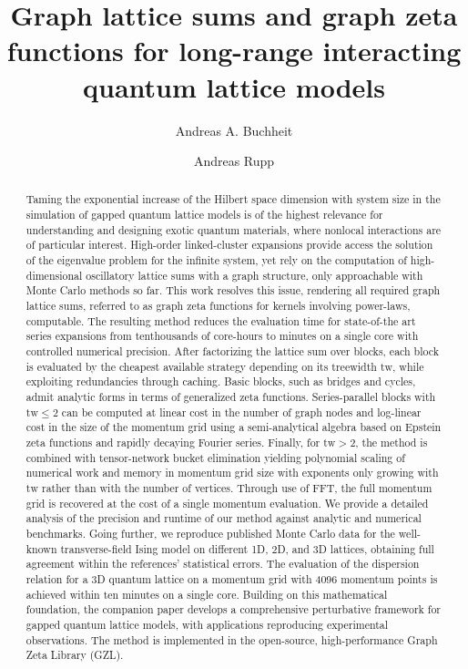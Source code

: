 \documentclass[]{amsart}
\numberwithin{mythm}{section}
\begin{document}
\title[Graph lattice sums]{Graph lattice sums and graph zeta functions for long-range interacting quantum lattice models}

\author{Andreas A. Buchheit}
\address{Saarland University, Department of Mathematics, 66123 Saarbrücken, Germany \\ 
ETH Zürich, Department of Mathematics, 8092 Zürich, Switzerland}

\author{Andreas Rupp}
\address{Saarland University, Department of Mathematics, 66123 Saarbrücken, Germany}



\begin{abstract}

Taming the exponential increase of the Hilbert space dimension with system size in the simulation of gapped quantum lattice models is of the highest relevance for understanding and designing exotic quantum materials, where nonlocal interactions are of particular interest. High-order linked-cluster expansions provide access the solution of the eigenvalue problem for the infinite system, yet rely on the computation of high-dimensional oscillatory lattice sums with a graph structure, only approachable with Monte Carlo methods so far. This work resolves this issue, rendering all required graph lattice sums, referred to as graph zeta functions for kernels involving power-laws, computable. The resulting method reduces the evaluation time for state-of-the art series expansions from tenthousands of core-hours to minutes on a single core with controlled numerical precision. After factorizing the lattice sum over blocks, each block is evaluated by the cheapest available strategy depending on its treewidth $\mathrm{tw}$, while exploiting redundancies through caching. Basic blocks, such as bridges and cycles, admit analytic forms in terms of generalized zeta functions. Series-parallel blocks with $\mathrm{tw}\le 2$ can be computed at linear cost in the number of graph nodes and log-linear cost in the size of the momentum grid using a semi-analytical algebra based on Epstein zeta functions and rapidly decaying Fourier series. Finally, for $\mathrm{tw}>2$, the method is combined with tensor-network bucket elimination yielding polynomial scaling of numerical work and memory in momentum grid size with exponents only growing with $\mathrm{tw}$ rather than with the number of vertices. Through use of FFT, the full momentum grid is recovered at the cost of a single momentum evaluation. We provide a detailed analysis of the precision and runtime of our method against analytic and numerical benchmarks. Going further, we reproduce published Monte Carlo data for the well-known transverse-field Ising model on different 1D, 2D, and 3D lattices, obtaining full agreement within the references' statistical errors. The evaluation of the dispersion relation for a 3D quantum lattice on a momentum grid with 4096 momentum points is achieved within ten minutes on a single core. Building on this mathematical foundation, the companion paper \cite{duft2026} develops a comprehensive perturbative framework for gapped quantum lattice models, with applications reproducing experimental observations. The method is implemented in the open-source, high-performance Graph Zeta Library (GZL).
\end{abstract}
\end{document}
